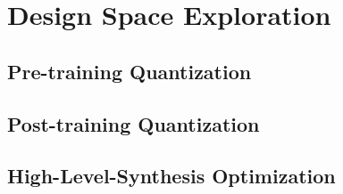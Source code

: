 \chapter{Design Space Exploration}
\indo{}

\section{Pre-training Quantization}


\section{Post-training Quantization}


\section{High-Level-Synthesis Optimization}
